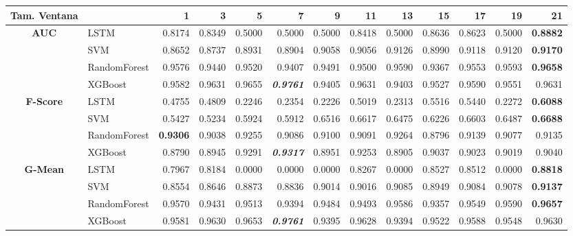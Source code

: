 \begin{table}[H]
	\centering
	\begin{adjustbox}{max width=14cm}
		\begin{tabular}{|c|l|r|r|r|r|r|r|r|r|r|r|r|}
			\hline
			\textbf{Tam. Ventana}&         &      1  &      3  &      5  &      7  &      9  &      11 &      13 &      15 &      17 &      19 &      21 \\
			\hline
			\textbf{AUC} &  LSTM &  0.8174 &  0.8349 &  0.5000 &  0.5000 &  0.5000 &  0.8418 &  0.5000 &  0.8636 &  0.8623 &  0.5000 & \textbf{  0.8882 } \\
			&  SVM &  0.8652 &  0.8737 &  0.8931 &  0.8904 &  0.9058 &  0.9056 &  0.9126 &  0.8990 &  0.9118 &  0.9120 & \textbf{  0.9170 } \\
			&  RandomForest &  0.9576 &  0.9440 &  0.9520 &  0.9407 &  0.9491 &  0.9500 &  0.9590 &  0.9367 &  0.9553 &  0.9593 & \textbf{  0.9658 } \\
			&  XGBoost &  0.9582 &  0.9631 &  0.9655 & \textit{ \textbf{  0.9761 } } &  0.9405 &  0.9631 &  0.9403 &  0.9527 &  0.9590 &  0.9551 &  0.9631 \\
			\hline
			\textbf{F-Score} &  LSTM &  0.4755 &  0.4809 &  0.2246 &  0.2354 &  0.2226 &  0.5019 &  0.2313 &  0.5516 &  0.5440 &  0.2272 & \textbf{  0.6088 } \\
			&  SVM &  0.5427 &  0.5234 &  0.5924 &  0.5912 &  0.6516 &  0.6617 &  0.6475 &  0.6226 &  0.6603 &  0.6487 & \textbf{  0.6688 } \\
			&  RandomForest & \textbf{  0.9306 } &  0.9038 &  0.9255 &  0.9086 &  0.9100 &  0.9091 &  0.9264 &  0.8796 &  0.9139 &  0.9077 &  0.9135 \\
			&  XGBoost &  0.8790 &  0.8945 &  0.9291 & \textit{ \textbf{  0.9317 } } &  0.8951 &  0.9253 &  0.8905 &  0.9037 &  0.9023 &  0.9019 &  0.9040 \\
			\hline
			\textbf{G-Mean} &  LSTM &  0.7967 &  0.8184 &  0.0000 &  0.0000 &  0.0000 &  0.8267 &  0.0000 &  0.8527 &  0.8512 &  0.0000 & \textbf{  0.8818 } \\
			&  SVM &  0.8554 &  0.8646 &  0.8873 &  0.8836 &  0.9014 &  0.9016 &  0.9085 &  0.8949 &  0.9084 &  0.9078 & \textbf{  0.9137 } \\
			&  RandomForest &  0.9570 &  0.9431 &  0.9513 &  0.9394 &  0.9484 &  0.9493 &  0.9586 &  0.9357 &  0.9549 &  0.9590 & \textbf{  0.9657 } \\
			&  XGBoost &  0.9581 &  0.9630 &  0.9653 & \textit{ \textbf{  0.9761 } } &  0.9395 &  0.9628 &  0.9394 &  0.9522 &  0.9588 &  0.9548 &  0.9630 \\

\end{tabular}
\end{adjustbox}
\end{table}
